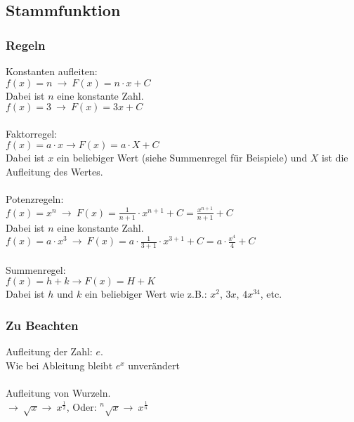 \subsection{Stammfunktion}
\subsubsection{Regeln}
\label{sec:aufleitungs_regeln}
Konstanten aufleiten: \\
$f(x) = n\ \rightarrow\ F(x) = n\cdot x + C$ \\
Dabei ist $n$ eine konstante Zahl. \\
$f(x) = 3\ \rightarrow\ F(x) = 3x + C$ \\\\
Faktorregel: \\
$f(x) = a\cdot x \rightarrow F(x) = a\cdot X + C$ \\
Dabei ist $x$ ein beliebiger Wert (siehe Summenregel für Beispiele) und $X$ ist die Aufleitung des Wertes. \\\\
Potenzregeln: \\
$f(x) = x^n\ \rightarrow\ F(x) = \frac{1}{n + 1}\cdot x^{n + 1} + C = \frac{x^{n+1}}{n+1} + C$\\
Dabei ist $n$ eine konstante Zahl. \\
$f(x) = a\cdot x^3\ \rightarrow\ F(x) = a\cdot \frac{1}{3 + 1}\cdot x^{3 + 1} + C= a\cdot \frac{x^{4}}{4} + C$ \\\\
Summenregel: \\
$f(x) = h + k \rightarrow F(x) = H + K$ \\
Dabei ist $h$ und $k$ ein beliebiger Wert wie z.B.: $x^2$, $3x$, $4x^34$, etc. \\

\subsubsection{Zu Beachten}
Aufleitung der Zahl: $e$. \\
Wie bei Ableitung bleibt $e^x$ unverändert
\\\\
Aufleitung von Wurzeln.\\
$\rightarrow\ \sqrt{x} \rightarrow\ x^{\frac{1}{2}}$, Oder: $^n\sqrt{x} \rightarrow\ x^{\frac{1}{n}}$
